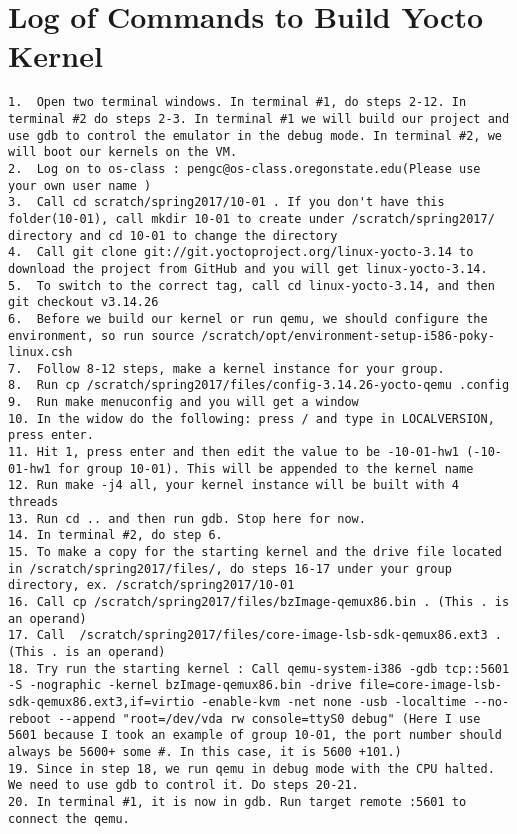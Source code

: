 \documentclass[letterpaper,10pt,titlepage]{article}
\begin{document}
\section{Log of Commands to Build Yocto Kernel}
\begin{lstlisting}
1.	Open two terminal windows. In terminal #1, do steps 2-12. In terminal #2 do steps 2-3. In terminal #1 we will build our project and use gdb to control the emulator in the debug mode. In terminal #2, we will boot our kernels on the VM.
2.	Log on to os-class : pengc@os-class.oregonstate.edu(Please use your own user name )
3.	Call cd scratch/spring2017/10-01 . If you don't have this folder(10-01), call mkdir 10-01 to create under /scratch/spring2017/ directory and cd 10-01 to change the directory
4.	Call git clone git://git.yoctoproject.org/linux-yocto-3.14 to download the project from GitHub and you will get linux-yocto-3.14.
5.	To switch to the correct tag, call cd linux-yocto-3.14, and then git checkout v3.14.26 
6.	Before we build our kernel or run qemu, we should configure the environment, so run source /scratch/opt/environment-setup-i586-poky-linux.csh 
7.	Follow 8-12 steps, make a kernel instance for your group.
8.	Run cp /scratch/spring2017/files/config-3.14.26-yocto-qemu .config
9.	Run make menuconfig and you will get a window
10.	In the widow do the following: press / and type in LOCALVERSION, press enter. 
11.	Hit 1, press enter and then edit the value to be -10-01-hw1 (-10-01-hw1 for group 10-01). This will be appended to the kernel name
12.	Run make -j4 all, your kernel instance will be built with 4 threads
13.	Run cd .. and then run gdb. Stop here for now.
14.	In terminal #2, do step 6.
15.	To make a copy for the starting kernel and the drive file located in /scratch/spring2017/files/, do steps 16-17 under your group directory, ex. /scratch/spring2017/10-01 
16.	Call cp /scratch/spring2017/files/bzImage-qemux86.bin . (This . is an operand)
17.	Call  /scratch/spring2017/files/core-image-lsb-sdk-qemux86.ext3 . (This . is an operand)
18.	Try run the starting kernel : Call qemu-system-i386 -gdb tcp::5601 -S -nographic -kernel bzImage-qemux86.bin -drive file=core-image-lsb-sdk-qemux86.ext3,if=virtio -enable-kvm -net none -usb -localtime --no-reboot --append "root=/dev/vda rw console=ttyS0 debug" (Here I use 5601 because I took an example of group 10-01, the port number should always be 5600+ some #. In this case, it is 5600 +101.)
19.	Since in step 18, we run qemu in debug mode with the CPU halted. We need to use gdb to control it. Do steps 20-21.
20.	In terminal #1, it is now in gdb. Run target remote :5601 to connect the qemu.

\end{lstlisting}
\end{document}
